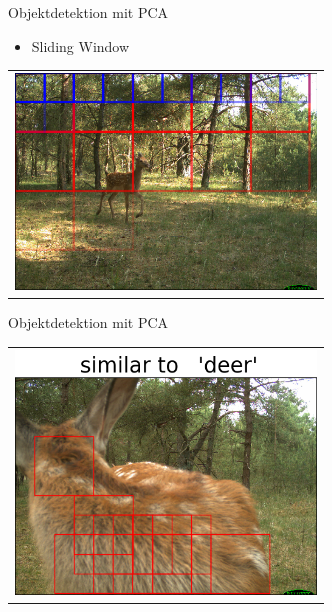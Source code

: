 \begin{frame}[t,fragile]{Objektdetektion mit PCA}

	\begin{itemize}
 \item{Sliding Window}
  \end{itemize}
  \vspace{0.01em}
  {
\begin{table}
\centering
        \begin{tabular}{c}
        \includegraphics[width=8cm]{img/Segmentierung/sliding.png}\\
         \end{tabular}
\end{table}
 }

\end{frame}


\begin{frame}[t,fragile]{Objektdetektion mit PCA}
  \vspace{0.01em}
  {
\begin{table}
\centering
        \begin{tabular}{c}
        \includegraphics[width=8cm]{img/Segmentierung/seg(1).png}\\
         \end{tabular}
\end{table}
 }

\end{frame}

